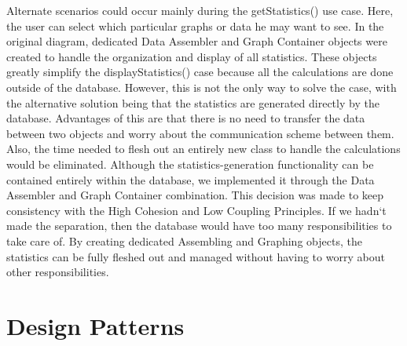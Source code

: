 \documentclass[letterpaper,english, 12pt]{scrreprt}
\begin{document}
Alternate scenarios could occur mainly during the getStatistics() use case. Here, the user can select which particular graphs or data he may want to see. In the original diagram,  dedicated Data Assembler and Graph Container objects were created to handle the organization and display of all statistics. These objects greatly simplify the displayStatistics() case because all the calculations are done outside of the database. However, this is not the only way to solve the case, with the alternative solution being that the statistics are generated directly by the database. Advantages of this are that there is no need to transfer the data between two objects and worry about the communication scheme between them. Also, the time needed to flesh out an entirely new class to handle the calculations would be eliminated. Although the statistics-generation functionality can be contained entirely within the database, we implemented it through the Data Assembler and Graph Container combination. This decision was made to keep consistency with the High Cohesion and Low Coupling Principles. If we hadn`t made the separation, then the database would have too many responsibilities to take care of. By creating dedicated Assembling and Graphing objects, the statistics can be fully fleshed out and managed without having to worry about other responsibilities.

\section{Design Patterns}
\end{document}
